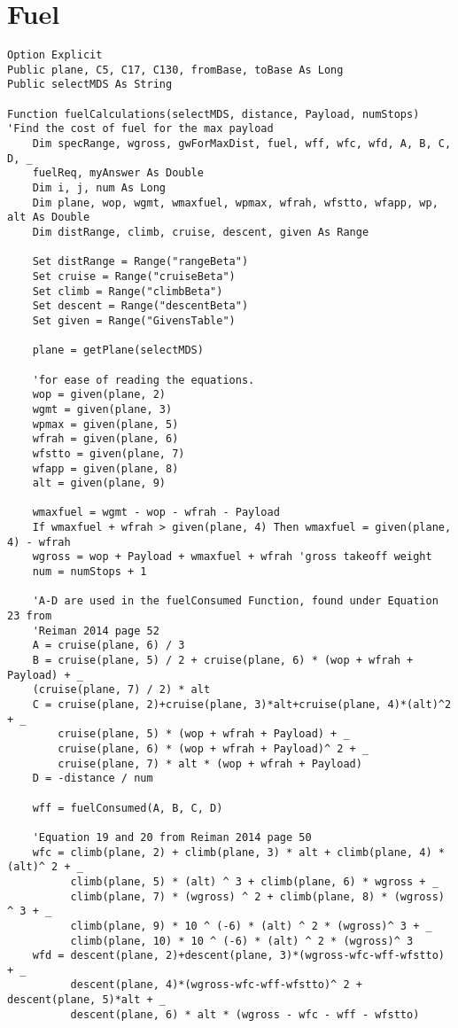 

\section{Fuel} \label{code_fuel}
\begin{lstlisting}
Option Explicit
Public plane, C5, C17, C130, fromBase, toBase As Long
Public selectMDS As String

Function fuelCalculations(selectMDS, distance, Payload, numStops)
'Find the cost of fuel for the max payload
    Dim specRange, wgross, gwForMaxDist, fuel, wff, wfc, wfd, A, B, C, D, _
    fuelReq, myAnswer As Double
    Dim i, j, num As Long
    Dim plane, wop, wgmt, wmaxfuel, wpmax, wfrah, wfstto, wfapp, wp, alt As Double
    Dim distRange, climb, cruise, descent, given As Range
    
    Set distRange = Range("rangeBeta")
    Set cruise = Range("cruiseBeta")
    Set climb = Range("climbBeta")
    Set descent = Range("descentBeta")
    Set given = Range("GivensTable")
    
    plane = getPlane(selectMDS)
    
    'for ease of reading the equations.
    wop = given(plane, 2)
    wgmt = given(plane, 3)
    wpmax = given(plane, 5)
    wfrah = given(plane, 6)
    wfstto = given(plane, 7)
    wfapp = given(plane, 8)
    alt = given(plane, 9)
    
    wmaxfuel = wgmt - wop - wfrah - Payload
    If wmaxfuel + wfrah > given(plane, 4) Then wmaxfuel = given(plane, 4) - wfrah
    wgross = wop + Payload + wmaxfuel + wfrah 'gross takeoff weight
    num = numStops + 1

    'A-D are used in the fuelConsumed Function, found under Equation 23 from
    'Reiman 2014 page 52
    A = cruise(plane, 6) / 3
    B = cruise(plane, 5) / 2 + cruise(plane, 6) * (wop + wfrah + Payload) + _
    (cruise(plane, 7) / 2) * alt
    C = cruise(plane, 2)+cruise(plane, 3)*alt+cruise(plane, 4)*(alt)^2 + _
        cruise(plane, 5) * (wop + wfrah + Payload) + _
        cruise(plane, 6) * (wop + wfrah + Payload)^ 2 + _
        cruise(plane, 7) * alt * (wop + wfrah + Payload)
    D = -distance / num
    
    wff = fuelConsumed(A, B, C, D)
    
    'Equation 19 and 20 from Reiman 2014 page 50
    wfc = climb(plane, 2) + climb(plane, 3) * alt + climb(plane, 4) * (alt)^ 2 + _
          climb(plane, 5) * (alt) ^ 3 + climb(plane, 6) * wgross + _
          climb(plane, 7) * (wgross) ^ 2 + climb(plane, 8) * (wgross) ^ 3 + _
          climb(plane, 9) * 10 ^ (-6) * (alt) ^ 2 * (wgross)^ 3 + _
          climb(plane, 10) * 10 ^ (-6) * (alt) ^ 2 * (wgross)^ 3
    wfd = descent(plane, 2)+descent(plane, 3)*(wgross-wfc-wff-wfstto) + _
          descent(plane, 4)*(wgross-wfc-wff-wfstto)^ 2 + descent(plane, 5)*alt + _
          descent(plane, 6) * alt * (wgross - wfc - wff - wfstto)
    

\end{lstlisting}
